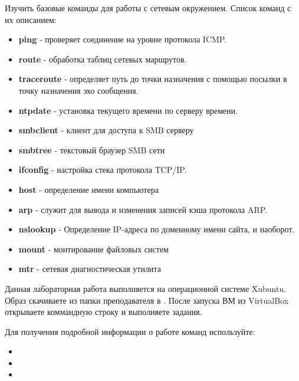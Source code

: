 \documentclass[a4paper,12pt]{article}
\begin{document}
  
  \begin{flushleft}
    Изучить базовые команды для работы с сетевым окружением.
    Список команд с их описанием:
    \begin{itemize}
     \item {\bf ping} - проверяет соединение на уровне протокола ICMP.
     \item {\bf route} - обработка таблиц сетевых маршрутов.
     \item {\bf traceroute} - определяет путь до точки назначения с помощью посылки в точку назначения эхо сообщения.
     \item {\bf ntpdate} - установка текущего времени по серверу времени.
     \item {\bf smbclient} - клиент для доступа к SMB серверу
     \item {\bf smbtree} - текстовый браузер SMB сети
     \item {\bf ifconfig} - настройка стека протокола TCP/IP.
     \item {\bf host} - определение имени компьютера
     \item {\bf arp} - служит для вывода и изменения записей кэша протокола ARP.
     \item {\bf nslookup} - Определение IP-адреса по доменному имени сайта, и наоборот.
     \item {\bf mount} - монтирование файловых систем
     \item {\bf mtr} - сетевая диагностическая утилита
    \end{itemize}
  \end{flushleft}
  

  \begin{flushleft}
    Данная лабораторная работа выполняется на операционной системе Xubuntu. Образ скачиваете из папки преподавателя в . После запуска ВМ из VirtualBox открываете коммандную строку и выполняете задания.
  \end{flushleft}

  \begin{flushleft}
   Для получения подробной информации о работе команд используйте:
   \begin{itemize}
    \item {}
    \item {}
    \item {}
   \end{itemize}
  \end{flushleft}
\end{document}
